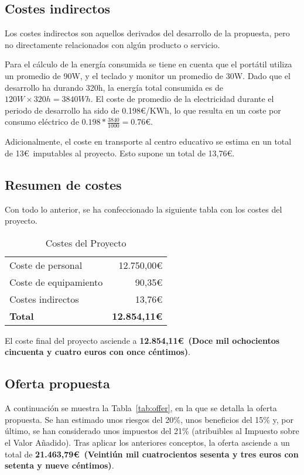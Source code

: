 \subsection{Costes indirectos}\label{subsec:indirect-cost}
Los costes indirectos son aquellos derivados del desarrollo de la propuesta, pero no directamente relacionados con algún producto o servicio.

Para el cálculo de la energía consumida se tiene en cuenta que el portátil utiliza un promedio de 90W, y el teclado y monitor un promedio de 30W. Dado que el desarrollo ha durando 320h, la energía total consumida es de $120W\times 320h = 3840Wh$. El coste de promedio de la electricidad durante el periodo de desarrollo ha sido de 0.198\euro/KWh, lo que resulta en un coste por consumo eléctrico de $0.198*\frac{3840}{1000} = 0.76$\euro.

Adicionalmente, el coste en transporte al centro educativo se estima en un total de 13\euro~imputables al proyecto. Esto supone un total de 13,76\euro.

\subsection{Resumen de costes}
Con todo lo anterior, se ha confeccionado la siguiente tabla con los costes del proyecto.

\begin{table}[H]
    \begin{tabular}{@{}lr@{}}
        \toprule
        Coste de personal & 12.750,00\euro\\
        Coste de equipamiento & 90,35\euro\\
        Costes indirectos & 13,76\euro\\ \midrule
        \textbf{Total} & \textbf{12.854,11\euro}\\
        \bottomrule
    \end{tabular}
    \caption{Costes del Proyecto}\label{tab:resumen-costes}
\end{table}

El coste final del proyecto asciende a \textbf{12.854,11\euro~(Doce mil ochocientos cincuenta y cuatro euros con once céntimos)}.

\subsection{Oferta propuesta}\label{subsec:offer}

A continuación se muestra la Tabla~\ref{tab:offer}, en la que se detalla la oferta propuesta. Se han estimado unos riesgos del 20\%, unos beneficios del 15\% y, por último, se han considerado unos impuestos del 21\% (atribuibles al Impuesto sobre el Valor Añadido). Tras aplicar los anteriores conceptos, la oferta asciende a un total de \textbf{21.463,79\euro~(Veintiún mil cuatrocientos sesenta y tres euros con setenta y nueve céntimos)}.


